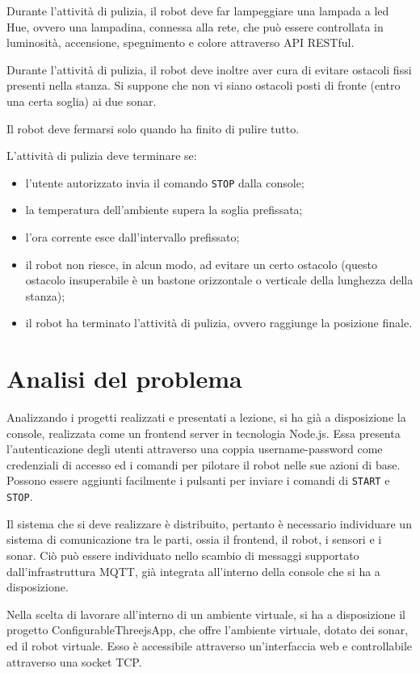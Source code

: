 Durante l'attività di pulizia, il robot deve far lampeggiare una lampada a led Hue, ovvero una lampadina, connessa alla rete, che può essere controllata in luminosità, accensione, spegnimento e colore attraverso API RESTful.

Durante l'attività di pulizia, il robot deve inoltre aver cura di evitare ostacoli fissi presenti nella stanza. Si suppone che non vi siano ostacoli posti di fronte (entro una certa soglia) ai due sonar.

Il robot deve fermarsi solo quando ha finito di pulire tutto.

L'attività di pulizia deve terminare se:
\begin{itemize}
\item l'utente autorizzato invia il comando \texttt{STOP} dalla console;
\item la temperatura dell'ambiente supera la soglia prefissata;
\item l'ora corrente esce dall'intervallo prefissato;
\item il robot non riesce, in alcun modo, ad evitare un certo ostacolo (questo ostacolo insuperabile è un bastone orizzontale o verticale della lunghezza della stanza);
\item il robot ha terminato l'attività di pulizia, ovvero raggiunge la posizione finale.
\end{itemize}

\section{Analisi del problema}
Analizzando i progetti realizzati e presentati a lezione, si ha già a disposizione la console, realizzata come un frontend server in tecnologia Node.js. Essa presenta l'autenticazione degli utenti attraverso una coppia username-password come credenziali di accesso ed i comandi per pilotare il robot nelle sue azioni di base. Possono essere aggiunti facilmente i pulsanti per inviare i comandi di \texttt{START} e \texttt{STOP}.

Il sistema che si deve realizzare è distribuito, pertanto è necessario individuare un sistema di comunicazione tra le parti, ossia il frontend, il robot, i sensori e i sonar. Ciò può essere individuato nello scambio di messaggi supportato dall'infrastruttura MQTT, già integrata all'interno della console che si ha a disposizione. 

Nella scelta di lavorare all'interno di un ambiente virtuale, si ha a disposizione il progetto ConfigurableThreejsApp, che offre l'ambiente virtuale, dotato dei sonar, ed il robot virtuale. Esso è accessibile attraverso un'interfaccia web e controllabile attraverso una socket TCP.

